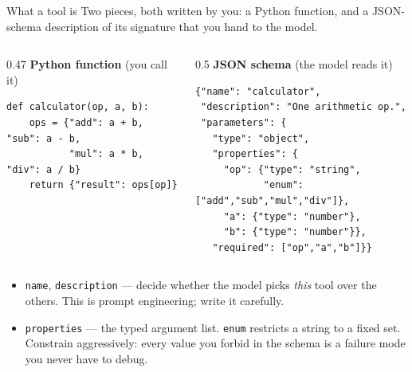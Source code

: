 \documentclass[aspectratio=169,10pt]{beamer}
\newcommand{\code}[1]{\texttt{\small #1}}
\begin{document}
\begin{frame}[fragile]{What a tool is}
Two pieces, both written by you: a Python function, and a JSON-schema
description of its signature that you hand to the model.

\vspace{0.5em}
\begin{columns}[T,onlytextwidth]
\begin{column}{0.47\textwidth}
{\footnotesize\textbf{Python function} (you call it)}
\begin{lstlisting}
def calculator(op, a, b):
    ops = {"add": a + b, "sub": a - b,
           "mul": a * b, "div": a / b}
    return {"result": ops[op]}
\end{lstlisting}
\end{column}
\begin{column}{0.5\textwidth}
{\footnotesize\textbf{JSON schema} (the model reads it)}
\begin{lstlisting}
{"name": "calculator",
 "description": "One arithmetic op.",
 "parameters": {
   "type": "object",
   "properties": {
     "op": {"type": "string",
            "enum": ["add","sub","mul","div"]},
     "a": {"type": "number"},
     "b": {"type": "number"}},
   "required": ["op","a","b"]}}
\end{lstlisting}
\end{column}
\end{columns}

\vspace{0.5em}
\begin{itemize}\itemsep2pt\small
  \item \code{name}, \code{description} --- decide whether the model picks
        \emph{this} tool over the others. This is prompt engineering; write it carefully.
  \item \code{properties} --- the typed argument list. \code{enum} restricts a
        string to a fixed set. Constrain aggressively: every value you forbid in the
        schema is a failure mode you never have to debug.
\end{itemize}
\end{frame}
\end{document}
